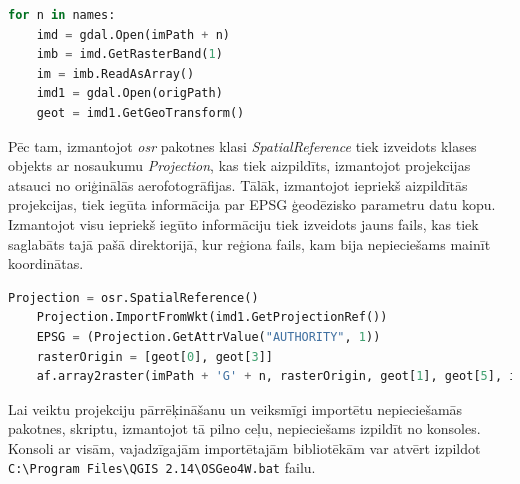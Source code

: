 \documentclass[12pt,paper=a4]{report}
\begin{document}
\begin{lstlisting}[language=Python]
for n in names:
    imd = gdal.Open(imPath + n)
    imb = imd.GetRasterBand(1)
    im = imb.ReadAsArray()
    imd1 = gdal.Open(origPath)
    geot = imd1.GetGeoTransform()
\end{lstlisting}\par
Pēc tam, izmantojot \textit{osr} pakotnes klasi \textit{SpatialReference} tiek izveidots klases objekts ar nosaukumu \textit{Projection}, kas tiek aizpildīts, izmantojot projekcijas atsauci no oriģinālās aerofotogrāfijas. Tālāk, izmantojot iepriekš aizpildītās projekcijas, tiek iegūta informācija par EPSG ģeodēzisko parametru datu kopu. Izmantojot visu iepriekš iegūto informāciju tiek izveidots jauns fails, kas tiek saglabāts tajā pašā direktorijā, kur reģiona fails, kam bija nepieciešams mainīt koordinātas.
\begin{lstlisting}[language=Python]
	Projection = osr.SpatialReference()
    Projection.ImportFromWkt(imd1.GetProjectionRef())
    EPSG = (Projection.GetAttrValue("AUTHORITY", 1))
    rasterOrigin = [geot[0], geot[3]]
    af.array2raster(imPath + 'G' + n, rasterOrigin, geot[1], geot[5], im, 1, gdal.GDT_UInt16, 3059)
\end{lstlisting}\par
Lai veiktu projekciju pārrēķināšanu un veiksmīgi importētu nepieciešamās pakotnes, skriptu, izmantojot tā pilno ceļu, nepieciešams izpildīt no konsoles. Konsoli ar visām, vajadzīgajām importētajām bibliotēkām var atvērt izpildot \verb|C:\Program Files\QGIS 2.14\OSGeo4W.bat| failu.
\end{document}
